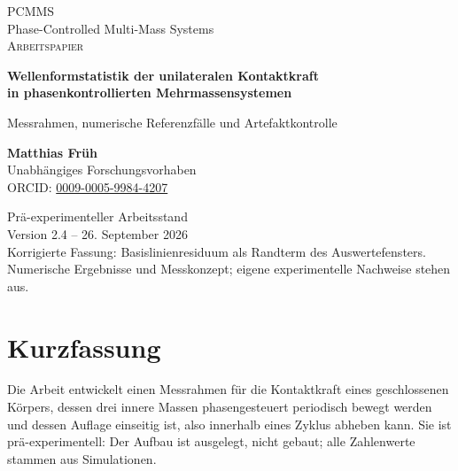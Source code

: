 \documentclass[12pt,a4paper]{report}
\begin{document}
\begin{titlepage}
\thispagestyle{empty}
\centering
\vspace*{1.2cm}
{\Large\textsc{PCMMS}}\\[0.3cm]
{\large Phase-Controlled Multi-Mass Systems}\\[1.5cm]
{\Large\textsc{Arbeitspapier}}\\[1.0cm]
{\LARGE\bfseries
Wellenformstatistik der unilateralen Kontaktkraft\\[0.3cm]
in phasenkontrollierten Mehrmassensystemen
\par}
\vspace{0.8cm}
{\large Messrahmen, numerische Referenzfälle und Artefaktkontrolle\par}
\vspace{1.5cm}
{\Large\textbf{Matthias Früh}}\\[0.4cm]
{\normalsize Unabhängiges Forschungsvorhaben}\\[0.3cm]
{\normalsize ORCID: \href{https://orcid.org/0009-0005-9984-4207}{0009-0005-9984-4207}}
\vfill
\begin{minipage}{0.9\textwidth}
\centering
Prä-experimenteller Arbeitsstand\\[0.3cm]
Version 2.4 -- 26. September 2026\\[0.6cm]
\small
Korrigierte Fassung: Basislinienresiduum als Randterm des Auswertefensters.\\
Numerische Ergebnisse und Messkonzept; eigene experimentelle Nachweise stehen aus.
\end{minipage}
\vspace*{0.7cm}
\end{titlepage}

\tableofcontents
\clearpage

\chapter*{Kurzfassung}

Die Arbeit entwickelt einen Messrahmen für die Kontaktkraft eines
geschlossenen Körpers, dessen drei innere Massen phasengesteuert
periodisch bewegt werden und dessen Auflage einseitig ist, also innerhalb
eines Zyklus abheben kann. Sie ist prä-experimentell: Der Aufbau ist
ausgelegt, nicht gebaut; alle Zahlenwerte stammen aus Simulationen.
\end{document}
